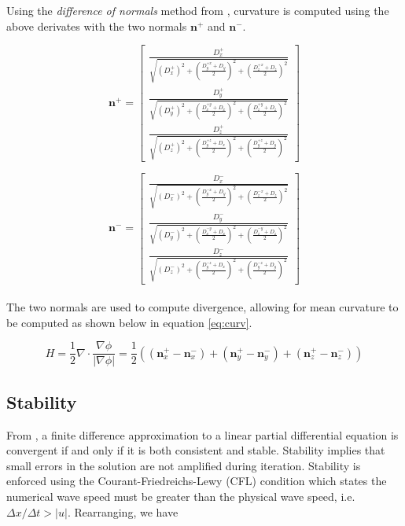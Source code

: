 Using the \textit{difference of normals} method from \cite{Lefohn04astreaming}, curvature is computed using the above derivates with the two normals $\textbf{n}^+$ and $\textbf{n}^-$.


\begin{equation}
\textbf{n}^+ = \left[
  \begin{array}{ c }
     \frac{D_x^+}{\sqrt{(D_x^+)^2 + {\left(\frac{D_y^{+x}+D_y}{2}\right)}^2 +{\left(\frac{D_z^{+x}+D_z}{2}\right)}^2  }}  \\[2em]
     \frac{D_y^+}{\sqrt{(D_y^+)^2 + {\left(\frac{D_x^{+y}+D_x}{2}\right)}^2 +{\left(\frac{D_z^{+y}+D_z}{2}\right)}^2  }}  \\[2em]
     \frac{D_z^+}{\sqrt{(D_z^+)^2 + {\left(\frac{D_y^{+z}+D_x}{2}\right)}^2 +{\left(\frac{D_y^{+z}+D_y}{2}\right)}^2  }}  
  \end{array} \right] 
\label{eq:nplus}
\end{equation}

\begin{equation}
\textbf{n}^- = \left[
  \begin{array}{ c }
     \frac{D_x^-}{\sqrt{(D_x^-)^2 + {\left(\frac{D_y^{-x}+D_y}{2}\right)}^2 +{\left(\frac{D_z^{-x}+D_z}{2}\right)}^2  }}  \\[2em]
     \frac{D_y^-}{\sqrt{(D_y^-)^2 + {\left(\frac{D_x^{-y}+D_x}{2}\right)}^2 +{\left(\frac{D_z^{-y}+D_z}{2}\right)}^2  }}  \\[2em]
     \frac{D_z^-}{\sqrt{(D_z^-)^2 + {\left(\frac{D_y^{-z}+D_x}{2}\right)}^2 +{\left(\frac{D_y^{-z}+D_y}{2}\right)}^2  }}  
  \end{array} \right]
\label{eq:nminus}
\end{equation}
\\
The two normals are used to compute divergence, allowing for mean curvature to be computed as shown below in equation \eqref{eq:curv}.

\begin{equation}
H = \frac{1}{2}\nabla\cdot\frac{\nabla\phi}{|\nabla\phi|} = \frac{1}{2}((\textbf{n}_x^+ - \textbf{n}_x^-)+(\textbf{n}_y^+ - \textbf{n}_y^-)+(\textbf{n}_z^+ - \textbf{n}_z^-))
\label{eq:curv}
\end{equation}


\subsection{Stability}\label{stability}
From \cite{osher2003lsm}, a finite difference approximation to a linear partial differential equation is convergent if and only if it is both consistent and stable. Stability implies that small errors in the solution are not amplified during iteration. Stability is enforced using the Courant-Friedreichs-Lewy (CFL) condition which states the numerical wave speed must be greater than the physical wave speed, i.e. $\Delta x/\Delta t>|u|$. Rearranging, we have

